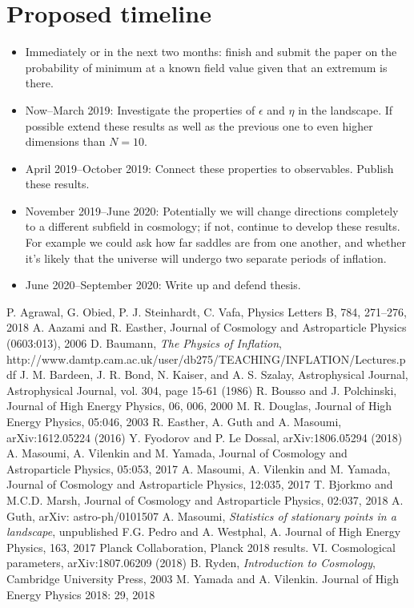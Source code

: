 \documentclass[12pt]{article}
\begin{document}
\section{Proposed timeline}
\begin{itemize}
\item Immediately or in the next two months: finish and submit the paper on the probability of minimum at a known field value given that an extremum is there.
\item Now--March 2019: Investigate the properties of $\epsilon$ and $\eta$ in the landscape. If possible extend these results as well as the previous one to even higher dimensions than $N=10$.
\item April 2019--October 2019: Connect these properties to observables. Publish these results.
\item November 2019--June 2020: Potentially we will change directions completely to a different subfield in cosmology; if not, continue to develop these results. For example we could ask how far saddles are from one another, and whether it's likely that the universe will undergo two separate periods of inflation.
\item June 2020--September 2020: Write up and defend thesis.
\end{itemize}

\begin{thebibliography}{99}
 P. Agrawal, G. Obied, P. J. Steinhardt, C. Vafa, Physics Letters B, 784, 271--276, 2018
 A. Aazami and R. Easther, Journal of Cosmology and Astroparticle Physics (0603:013), 2006
 D. Baumann, \emph{The Physics of Inflation}, http://www.damtp.cam.ac.uk/user/db275/TEACHING/INFLATION/Lectures.pdf
 J. M. Bardeen, J. R. Bond, N. Kaiser, and A. S. Szalay, Astrophysical Journal, Astrophysical Journal, vol. 304, page 15-61 (1986)
 R. Bousso and J. Polchinski, Journal of High Energy Physics, 06, 006, 2000
 M. R. Douglas, Journal of High Energy Physics, 05:046, 2003
 R. Easther, A. Guth and A. Masoumi, arXiv:1612.05224 (2016)
 Y. Fyodorov and P. Le Dossal, arXiv:1806.05294 (2018)
 A. Masoumi, A. Vilenkin and M. Yamada, Journal of Cosmology and Astroparticle Physics, 05:053, 2017
 A. Masoumi, A. Vilenkin and M. Yamada, Journal of Cosmology and Astroparticle Physics, 12:035, 2017
 T. Bjorkmo and M.C.D. Marsh, Journal of Cosmology and Astroparticle Physics, 02:037, 2018
 A. Guth, arXiv: astro-ph/0101507
 A. Masoumi, \emph{Statistics of stationary points in a landscape}, unpublished
 F.G. Pedro and A. Westphal, A. Journal of High Energy Physics, 163, 2017
 Planck Collaboration, Planck 2018 results. VI. Cosmological parameters, arXiv:1807.06209 (2018)
 B. Ryden, \emph{Introduction to Cosmology}, Cambridge University Press, 2003
 M. Yamada and A. Vilenkin. Journal of High Energy Physics 2018: 29, 2018
\end{thebibliography}
\end{document}
